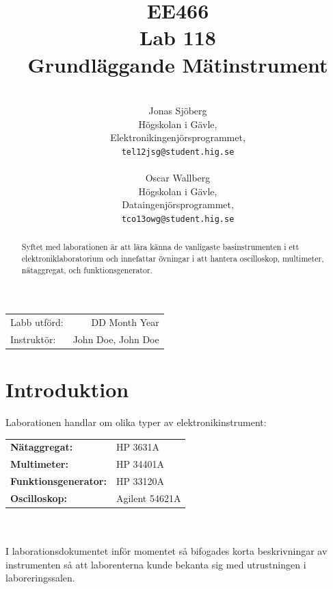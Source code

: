 \documentclass[11pt,a4paper]{article}
\title{EE466 \\ Lab 118 \\ Grundläggande Mätinstrument}
\author{\\
  Jonas Sjöberg\\
  Högskolan i Gävle,\\
  Elektronikingenjörsprogrammet,\\
  \texttt{tel12jsg@student.hig.se}\\
  \\
  Oscar Wallberg\\
  Högskolan i Gävle,\\
  Dataingenjörsprogrammet,\\
  \texttt{tco13owg@student.hig.se}\\}
\date{}
\begin{document}
\maketitle

\begin{center}
\begin{tabular}{l r}
    Labb utförd: & DD Month Year \\
    Instruktör: & John Doe, John Doe
\end{tabular}
\end{center}

\begin{abstract}
    Syftet med laborationen är att lära känna de vanligaste basinstrumenten i
    ett elektroniklaboratorium och innefattar övningar i att hantera
    oscilloskop, multimeter, nätaggregat, och funktionsgenerator.
\end{abstract}

\newpage

{
    \setcounter{tocdepth}{3}
    \tableofcontents
}

\newpage

\section{Introduktion}\label{setup}
Laborationen handlar om olika typer av elektronikinstrument:\\
\begin{tabular}{ll}
\rule{0pt}{3ex}\textbf{Nätaggregat:} & HP 3631A\\
\textbf{Multimeter:} & HP 34401A\\
\textbf{Funktionsgenerator:} & HP 33120A\\
\textbf{Oscilloskop:} & Agilent 54621A
\end{tabular}
\\
\\
I laborationsdokumentet inför momentet så bifogades korta beskrivningar av instrumenten så att laborenterna kunde bekanta sig med utrustningen i laboreringssalen.
\par 
\end{document}
